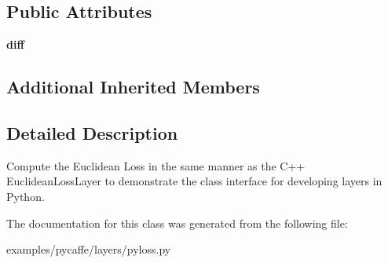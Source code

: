 \subsection*{Public Attributes}
\begin{DoxyCompactItemize}
\item 
\mbox{\label{classpyloss_1_1_euclidean_loss_layer_a2e13c6dc8504a4ae7df9aa81e6404c4e}} 
{\bfseries diff}
\end{DoxyCompactItemize}
\subsection*{Additional Inherited Members}


\subsection{Detailed Description}
\begin{DoxyVerb}Compute the Euclidean Loss in the same manner as the C++ EuclideanLossLayer
to demonstrate the class interface for developing layers in Python.
\end{DoxyVerb}
 

The documentation for this class was generated from the following file\+:\begin{DoxyCompactItemize}
\item 
examples/pycaffe/layers/pyloss.\+py\end{DoxyCompactItemize}
